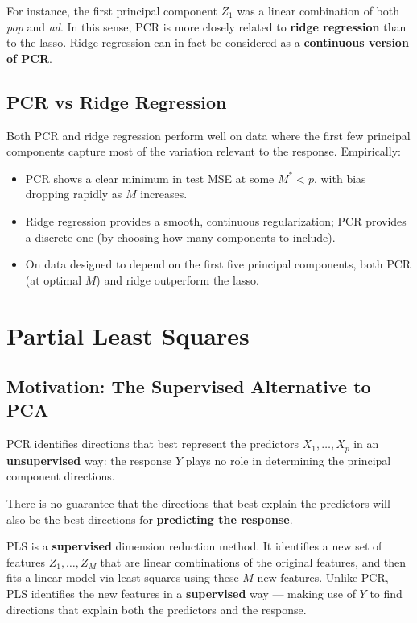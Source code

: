 \documentclass[11pt,a4paper]{article}
\theoremstyle{definition}
\theoremstyle{plain}
\theoremstyle{remark}
\begin{document}
For instance, the first principal component $Z_1$ was a linear combination of both \textit{pop} and \textit{ad}. In this sense, PCR is more closely related to \textbf{ridge regression} than to the lasso. Ridge regression can in fact be considered as a \textbf{continuous version of PCR}.

\subsection{PCR vs Ridge Regression}

Both PCR and ridge regression perform well on data where the first few principal components capture most of the variation relevant to the response. Empirically:
\begin{itemize}
    \item PCR shows a clear minimum in test MSE at some $M^* < p$, with bias dropping rapidly as $M$ increases.
    \item Ridge regression provides a smooth, continuous regularization; PCR provides a discrete one (by choosing how many components to include).
    \item On data designed to depend on the first five principal components, both PCR (at optimal $M$) and ridge outperform the lasso.
\end{itemize}

\section{Partial Least Squares}

\subsection{Motivation: The Supervised Alternative to PCA}

PCR identifies directions that best represent the predictors $X_1, \ldots, X_p$ in an \textbf{unsupervised} way: the response $Y$ plays no role in determining the principal component directions.

\begin{tcolorbox}[colback=orange!5!white,colframe=orange!75!black,title=\textbf{Main Drawback of PCR}]
There is no guarantee that the directions that best explain the predictors will also be the best directions for \textbf{predicting the response}.
\end{tcolorbox}

\begin{tcolorbox}[colback=blue!5!white,colframe=blue!75!black,title=\textbf{Partial Least Squares (PLS)}]
PLS is a \textbf{supervised} dimension reduction method. It identifies a new set of features $Z_1, \ldots, Z_M$ that are linear combinations of the original features, and then fits a linear model via least squares using these $M$ new features. Unlike PCR, PLS identifies the new features in a \textbf{supervised} way — making use of $Y$ to find directions that explain both the predictors and the response.
\end{tcolorbox}
\end{document}
